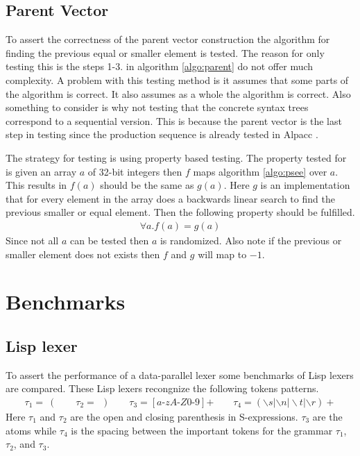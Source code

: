 \documentclass[a4paper,12pt]{article}
\theoremstyle{definition}
\begin{document}
\subsection{Parent Vector}
To assert the correctness of the parent vector construction the algorithm for finding the previous equal or smaller element is tested. The reason for only testing this is the steps 1-3. in algorithm \ref{algo:parent} do not offer much complexity. A problem with this testing method is it assumes that some parts of the algorithm is correct. It also assumes as a whole the algorithm is correct. Also something to consider is why not testing that the concrete syntax trees correspond to a sequential version. This is because the parent vector is the last step in testing since the production sequence is already tested in Alpacc \cite{due2023}.

The strategy for testing is using property based testing. The property tested for is given an array $a$ of 32-bit integers then $f$ maps algorithm \ref{algo:psee} over $a$. This results in $f(a)$ should be the same as $g(a)$. Here $g$ is an implementation that for every element in the array does a backwards linear search to find the previous smaller or equal element. Then the following property should be fulfilled.
\begin{align*}
  \forall a. f(a) = g(a)
\end{align*}
Since not all $a$ can be tested then $a$ is randomized. Also note if the previous or smaller element does not exists then $f$ and $g$ will map to $-1$.

\section{Benchmarks}
\subsection{Lisp lexer}
To assert the performance of a data-parallel lexer some benchmarks of Lisp lexers are compared. These Lisp lexers recongnize the following tokens patterns.
\begin{align*}
  \tau_1 = \: ( \qquad \tau_2 = \: \:) \qquad \tau_3 = [a\text{-}zA\text{-}Z0\text{-}9]\text{+} \qquad \tau_4 = (\backslash s|\backslash n |\backslash t | \backslash r)+
\end{align*}
Here $\tau_1$ and $\tau_2$ are the open and closing parenthesis in S-expressions. $\tau_3$ are the atoms while $\tau_4$ is the spacing between the important tokens for the grammar $\tau_1$, $\tau_2$, and $\tau_3$.
\end{document}
